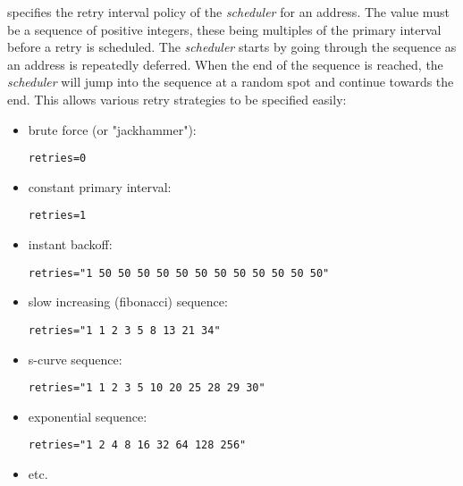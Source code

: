 \begin{description}
specifies the retry interval 
policy of the {\em scheduler\/} for an address. The value must be a sequence 
of positive integers, these being multiples of the primary interval before a 
retry is scheduled. The {\em scheduler\/} starts by going through the 
sequence as an address is repeatedly deferred. When the end of the sequence 
is reached, the {\em scheduler\/} will jump into the sequence at a random 
spot and continue towards the end. This allows various retry strategies to be 
specified easily:
\begin{itemize}
\item brute force (or "jackhammer"):
\begin{tscreen}
\begin{verbatim}
retries=0
\end{verbatim}
\end{tscreen}
\item constant primary interval:
\begin{tscreen}
\begin{verbatim}
retries=1
\end{verbatim}
\end{tscreen}
\item instant backoff:
\begin{tscreen}
\begin{verbatim}
retries="1 50 50 50 50 50 50 50 50 50 50 50 50"
\end{verbatim}
\end{tscreen}
\item slow increasing (fibonacci) sequence:
\begin{tscreen}
\begin{verbatim}
retries="1 1 2 3 5 8 13 21 34"
\end{verbatim}
\end{tscreen}
\item s-curve sequence:
\begin{tscreen}
\begin{verbatim}
retries="1 1 2 3 5 10 20 25 28 29 30"
\end{verbatim}
\end{tscreen}
\item exponential sequence:
\begin{tscreen}
\begin{verbatim}
retries="1 2 4 8 16 32 64 128 256"
\end{verbatim}
\end{tscreen}
\item etc.
\end{itemize}





\end{description}
